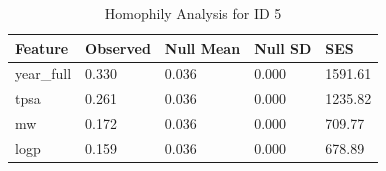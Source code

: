 \begin{table}
\caption{Homophily Analysis for ID 5}
\label{tab:homophily_id5}
\begin{tabular}{lllll}
\toprule
Feature & Observed & Null Mean & Null SD & SES \\
\midrule
year_full & 0.330 & 0.036 & 0.000 & 1591.61 \\
tpsa & 0.261 & 0.036 & 0.000 & 1235.82 \\
mw & 0.172 & 0.036 & 0.000 & 709.77 \\
logp & 0.159 & 0.036 & 0.000 & 678.89 \\
\bottomrule
\end{tabular}
\end{table}
